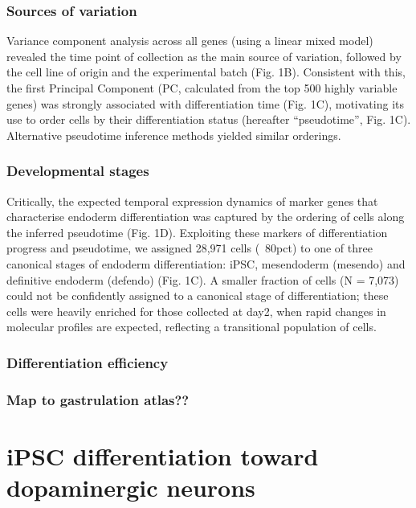 \subsubsection{Sources of variation} 

Variance component analysis across all genes (using a linear mixed model) revealed the time point of collection as the main source of variation, followed by the cell line of origin and the experimental batch (Fig. 1B). 
Consistent with this, the first Principal Component (PC, calculated from the top 500 highly variable genes) was strongly associated with differentiation time (Fig. 1C), motivating its use to order cells by their differentiation status (hereafter “pseudotime”, Fig. 1C).
Alternative pseudotime inference methods yielded similar orderings.

\subsubsection{Developmental stages}
 
Critically, the expected temporal expression dynamics of marker genes that characterise endoderm differentiation was captured by the ordering of cells along the inferred pseudotime (Fig. 1D). 
Exploiting these markers of differentiation progress and pseudotime, we assigned 28,971 cells (~80pct) to one of three canonical stages of endoderm differentiation: iPSC, mesendoderm (mesendo) and definitive endoderm (defendo) (Fig. 1C). 
A smaller fraction of cells (N = 7,073) could not be confidently assigned to a canonical stage of differentiation; these cells were heavily enriched for those collected at day2, when rapid changes in molecular profiles are expected, reflecting a transitional population of cells.

\subsubsection{Differentiation efficiency}

\subsubsection{Map to gastrulation atlas??}

\newpage


\section{iPSC differentiation toward dopaminergic neurons}

